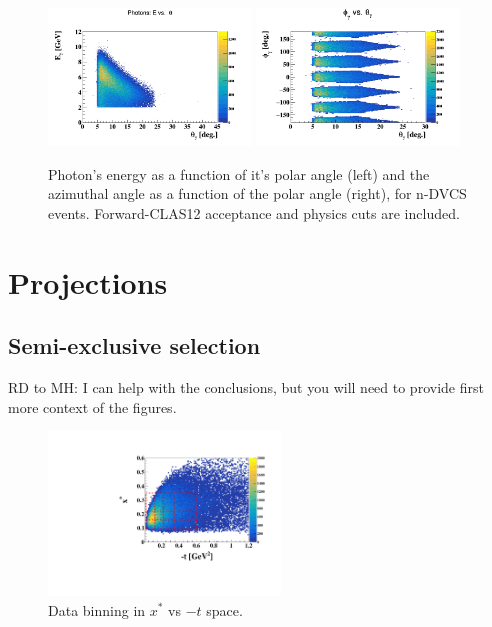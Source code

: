 \begin{figure}[htb]
\centering
   \includegraphics[width=0.48\textwidth,clip,trim=0mm 0mm 0mm 
   20mm]{figs/gamma_E_theta.png}
\includegraphics[width=0.48\textwidth,clip,trim=0mm 0mm 0mm 
   20mm]{figs/gamma_phi_theta.png}
   \caption{Photon's energy as a function of it's polar angle (left) and the 
   azimuthal angle as a function of the polar angle (right), for n-DVCS events.  
   Forward-CLAS12 acceptance and physics cuts are included.}
   \label{fig:photon_kin}
\end{figure}
 

 

\section{Projections}
\subsection{Semi-exclusive selection}
RD to MH: I can help with the conclusions, but you will need to provide first more 
context of the figures. 

\begin{figure}[htb]
  \centering
    \includegraphics[width=0.55\textwidth,clip]{figs/pdf/t_x*.pdf}
  \caption{Data binning in $x^{*}$ vs $-t$ space.
   \label{fig:binning_x_t}}
\end{figure}

